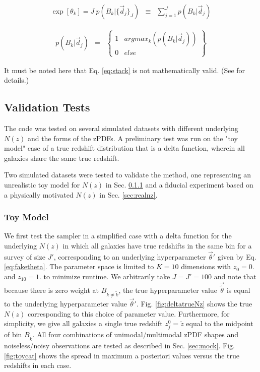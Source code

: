 \documentclass[preprint]{aastex}
\begin{document}
\begin{eqnarray}
\label{eq:stack}
\exp[\theta_{k}] = J\ p(B_{k}|\{\vec{d}_{j}\}_{J}) &\equiv& \sum_{j=1}^{J}p(B_{k}|\vec{d}_{j})
\end{eqnarray}

\begin{eqnarray}
\label{eq:map}
p(B_{k}|\vec{d}_{j}) &=& \left\{\begin{array}{cc}1&argmax_{k}(p(B_{k}|\vec{d}_{j}))\\0&else\end{array}\right\}
\end{eqnarray}

It must be noted here that Eq. \ref{eq:stack} is not mathematically valid.  (See \citet{hog12} for details.)

\subsection{Validation Tests}
\label{sec:valid}

The code was tested on several simulated datasets with different underlying $N(z)$ and the forms of the zPDFs.  A preliminary test was run on the "toy model" case of a true redshift distribution that is a delta function, wherein all galaxies share the same true redshift.  

Two simulated datasets were tested to validate the method, one representing an unrealistic toy model for $N(z)$ in Sec. \ref{sec:fake} and a fiducial experiment based on a physically motivated $N(z)$ in Sec. \ref{sec:realnz}.%

\subsubsection{Toy Model}
\label{sec:fake}

We first test the sampler in a simplified case with a delta function for the underlying $N(z)$ in which all galaxies have true redshifts in the same bin for a survey of size $J'$, corresponding to an underlying hyperparameter $\vec{\theta}'$ given by Eq. \ref{eq:faketheta}.  The parameter space is limited to $K=10$ dimensions with $z_{0}=0.$ and $z_{10}=1.$ to minimize runtime.  We arbitrarily take $J=J'=100$ and note that because there is zero weight at $B_{k\neq\tilde{k}}$, the true hyperparameter value $\vec{\tilde{\theta}}$ is equal to the underlying hyperparameter value $\vec{\theta}'$.  Fig. \ref{fig:deltatrueNz} shows the true $N(z)$ corresponding to this choice of parameter value.  Furthermore, for simplicity, we give all galaxies a single true redshift $z_{j}^{0}=\tilde{z}$ equal to the midpoint of bin $B_{\tilde{k}}$.  All four combinations of unimodal/multimodal zPDF shapes and noiseless/noisy observations are tested as described in Sec. \ref{sec:mock}.  Fig. \ref{fig:toycat} shows the spread in maximum a posteriori values versus the true redshifts in each case.
\end{document}

